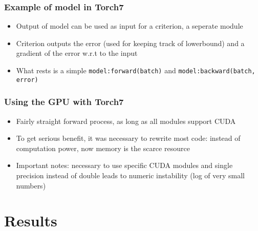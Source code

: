 \documentclass{beamer}
\begin{document}
\begin{frame}
\frametitle{Example of model in Torch7}

\begin{itemize}
	\item Output of model can be used as input for a criterion, a seperate module
	\item Criterion outputs the error (used for keeping track of lowerbound) and a gradient of the error w.r.t to the input
	\item What rests is a simple \texttt{model:forward(batch)} and \texttt{model:backward(batch, error)}
\end{itemize}

\end{frame}

\begin{frame}
\frametitle{Using the GPU with Torch7}

\begin{itemize}
	\item Fairly straight forward process, as long as all modules support CUDA
	\item To get serious benefit, it was necessary to rewrite most code: instead of computation power, now memory is the scarce resource
	\item Important notes: necessary to use specific CUDA modules and single precision instead of double leads to numeric instability (log of very small numbers)
\end{itemize}

\end{frame}

 
\section{Results}

\end{document}
